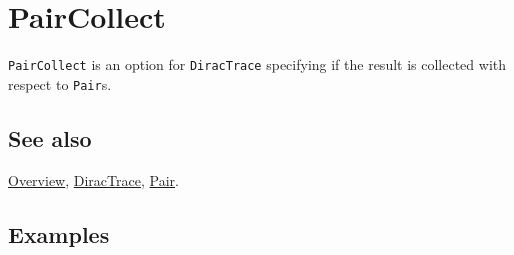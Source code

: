 \documentclass[../FeynCalcManual.tex]{subfiles}
\begin{document}
\hypertarget{paircollect}{%
\section{PairCollect}\label{paircollect}}

\texttt{PairCollect} is an option for \texttt{DiracTrace} specifying if
the result is collected with respect to \texttt{Pair}s.

\subsection{See also}

\hyperlink{toc}{Overview}, \hyperlink{diractrace}{DiracTrace},
\hyperlink{pair}{Pair}.

\subsection{Examples}
\end{document}
